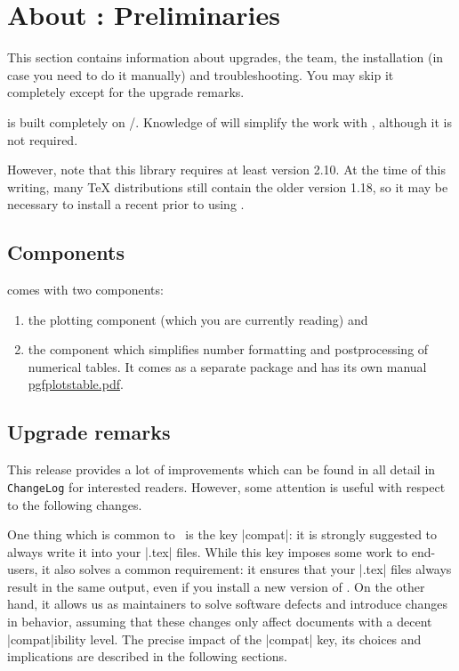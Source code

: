 
\chapter[About PGFPlots: Preliminaries]{About {\normalfont\PGFPlots{}}: Preliminaries}

This section contains information about upgrades, the team, the installation
(in case you need to do it manually) and troubleshooting. You may skip it
completely except for the upgrade remarks.

\PGFPlots{} is built completely on \Tikz{}/\PGF{}. Knowledge of \Tikz{} will
simplify the work with \PGFPlots{}, although it is not required.

However, note that this library requires at least \PGF{} version 2.10. At the
time of this writing, many \TeX{} distributions still contain the older \PGF{}
version 1.18, so it may be necessary to install a recent \PGF{} prior to using
\PGFPlots{}.


\section{Components}

\PGFPlots{} comes with two components:
%
\begin{enumerate}
    \item the plotting component (which you are currently reading) and
    \item the \PGFPlotstable{} component which simplifies number formatting
        and postprocessing of numerical tables. It comes as a separate
        package and has its own manual
        \href{file:pgfplotstable.pdf}{pgfplotstable.pdf}.
\end{enumerate}


\section{Upgrade remarks}

This release provides a lot of improvements which can be found in all detail in
\texttt{ChangeLog} for interested readers. However, some attention is useful
with respect to the following changes.

One thing which is common to \PGFPlots\ is the key |compat|: it is strongly suggested to always write it into your |.tex| files. While this key imposes some work to end-users, it also solves a common requirement: it ensures that your |.tex| files always result in the same output, even if you install a new version of \PGFPlots. On the other hand, it allows us as maintainers to solve software defects and introduce changes in behavior, assuming that these changes only affect documents with a decent |compat|ibility level. The precise impact of the |compat| key, its choices and implications are described in the following sections.

